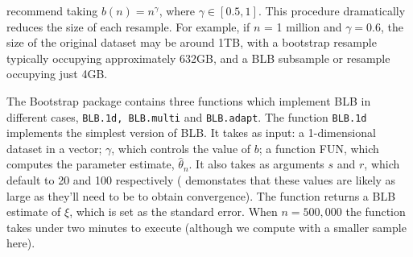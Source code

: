\documentclass{article}
\begin{document}

\textcite{Kleiner2014} recommend taking $b(n) = n^{\gamma}$, where $\gamma \in [0.5,1]$. This procedure dramatically reduces the size of each resample. For example, if $n$ = 1 million and $\gamma=0.6$, the size of the original dataset may be around 1TB, with a bootstrap resample typically occupying approximately 632GB, and a BLB subsample or resample occupying just 4GB.

The Bootstrap package contains three functions which implement BLB in different cases, \texttt{BLB.1d, BLB.multi} and \texttt{BLB.adapt}. The function \texttt{BLB.1d} implements the simplest version of BLB. It takes as input: a 1-dimensional dataset in a vector; $\gamma$, which controls the value of $b$; a function FUN, which computes the parameter estimate, $\hat\theta_n$. It also takes as arguments $s$ and $r$, which default to 20 and 100 respectively (\textcite{Kleiner2014} demonstates that these values are likely as large as they'll need to be to obtain convergence). The function returns a BLB estimate of $\xi$, which is set as the standard error. When $n=500,000$ the function takes under two minutes to execute (although we compute with a smaller sample here).

\printbibliography
\end{document}
